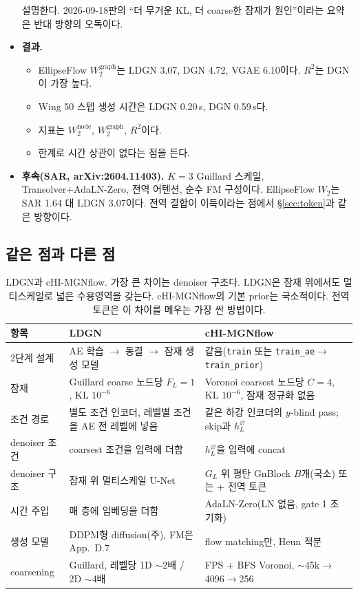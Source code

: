 \documentclass[11pt]{article}
\newcommand{\code}[1]{\texttt{#1}}
\begin{document}
\begin{itemize}
  설명한다. 2026-09-18판의 ``더 무거운 KL, 더 coarse한 잠재가 원인''이라는
  요약은 반대 방향의 오독이다.
\item \textbf{결과.}
  \begin{itemize}
  \item EllipseFlow $W_2^{\text{graph}}$는 LDGN 3.07, DGN 4.72, VGAE 6.10이다.
    $R^2$는 DGN이 가장 높다.
  \item Wing 50 스텝 생성 시간은 LDGN 0.20\,s, DGN 0.59\,s다.
  \item 지표는 $W_2^{\text{node}}$, $W_2^{\text{graph}}$, $R^2$이다.
  \item 한계로 시간 상관이 없다는 점을 든다.
  \end{itemize}
\item \textbf{후속(SAR, arXiv:2604.11403).} $K=3$ Guillard 스케일,
  Transolver+AdaLN-Zero, 전역 어텐션, 순수 FM 구성이다. EllipseFlow
  $W_2$는 SAR 1.64 대 LDGN 3.07이다. 전역 결합이 이득이라는 점에서
  \S\ref{sec:token}과 같은 방향이다.
\end{itemize}

\subsection{같은 점과 다른 점}

\begin{table}[!htbp]
\centering
\footnotesize
\begin{tabularx}{\textwidth}{@{}l Y Y@{}}
\toprule
항목 & LDGN & cHI-MGNflow \\
\midrule
2단계 설계 & AE 학습 $\to$ 동결 $\to$ 잠재 생성 모델 & 같음(\code{train} 또는 \code{train\_ae}$\to$\code{train\_prior}) \\
잠재 & Guillard coarse 노드당 $F_L=1$, KL $10^{-6}$ & Voronoi coarsest 노드당 $C=4$, KL $10^{-6}$, 잠재 정규화 없음 \\
조건 경로 & 별도 조건 인코더, 레벨별 조건을 AE 전 레벨에 넣음 & 같은 하강 인코더의 $y$-blind pass; skip과 $h_L^{\varnothing}$ \\
denoiser 조건 & coarsest 조건을 입력에 더함 & $h_L^{\varnothing}$을 입력에 concat \\
denoiser 구조 & 잠재 위 멀티스케일 U-Net & $G_L$ 위 평탄 GnBlock $B$개(국소) 또는 + 전역 토큰 \\
시간 주입 & 매 층에 임베딩을 더함 & AdaLN-Zero(LN 없음, gate 1 초기화) \\
생성 모델 & DDPM형 diffusion(주), FM은 App.~D.7 & flow matching만, Heun 적분 \\
coarsening & Guillard, 레벨당 1D $\sim$2배 / 2D $\sim$4배 & FPS + BFS Voronoi, $\sim$45k$\to$4096$\to$256 \\
\bottomrule
\end{tabularx}
\caption{LDGN과 cHI-MGNflow. 가장 큰 차이는 denoiser 구조다. LDGN은 잠재
  위에서도 멀티스케일로 넓은 수용영역을 갖는다. cHI-MGNflow의 기본 prior는
  국소적이다. 전역 토큰은 이 차이를 메우는 가장 싼 방법이다.}
\label{tab:ldgn}
\end{table}
\end{document}
